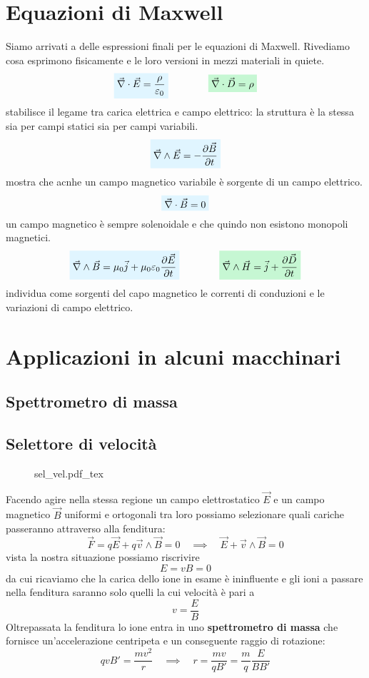 \documentclass[x11names]{report}
\newcommand{\incfig}[1]{%
	{#1.pdf_tex}
}
\newcommand{\viola}[1]{%
	\colorbox{myblue}{$\displaystyle #1$}
}
\newcommand{\rosso}[1]{%
	\colorbox{myred}{$\displaystyle #1$}}
\begin{document}
\section{Equazioni di Maxwell}
Siamo arrivati a delle espressioni finali per le equazioni di Maxwell. Rivediamo cosa esprimono fisicamente e le loro versioni in mezzi materiali in quiete.
\[
\viola{\vec{\nabla}\cdot \vec{E} = \frac{\rho}{\varepsilon_0}} \qquad \qquad \rosso{\vec{\nabla}\cdot \vec{D} = \rho}
\]
stabilisce il legame tra carica elettrica e campo elettrico: la struttura è la stessa sia per campi statici sia per campi variabili.
\[
\viola{\vec{\nabla}\wedge \vec{E} = -\frac{\partial \vec{B}}{\partial t}} 
\]
mostra che acnhe un campo magnetico variabile è sorgente di un campo elettrico.
\[
\viola{\vec{\nabla}\cdot \vec{B} = 0}
\]
un campo magnetico è sempre solenoidale e che quindo non esistono monopoli magnetici.
\[
\viola{\vec{\nabla}\wedge \vec{B} = \mu_0 \vec{j} + \mu_0\varepsilon_0\frac{\partial\vec{E}}{\partial t}} \qquad \qquad \rosso{\vec{\nabla} \wedge \vec{H} = \vec{j} + \frac{\partial \vec{D}}{\partial t}}
\]
individua come sorgenti del capo magnetico le correnti di conduzioni e le variazioni di campo elettrico.
\newpage
\section{Applicazioni in alcuni macchinari}
\subsection{Spettrometro di massa}
\subsection{Selettore di velocità}
\begin{wrapfigure}{r}{0.3\textwidth}
	\incfig{sel_vel}
\end{wrapfigure}
Facendo agire nella stessa regione un campo elettrostatico \(\vec{E}\) e un campo magnetico \(\vec{B}\) uniformi e ortogonali tra loro possiamo selezionare quali cariche passeranno attraverso alla fenditura:
\[
\vec{F} = q\vec{E} + q\vec{v}\wedge\vec{B} = 0 \quad \implies\quad \vec{E} + \vec{v} \wedge \vec{B} = 0
\]
vista la nostra situazione possiamo riscrivire
\[
E = vB = 0
\]
da cui ricaviamo che la carica dello ione in esame è ininfluente e gli ioni a passare nella fenditura saranno solo quelli la cui velocità è pari a
\[
v = \frac{E}{B}
\]
Oltrepassata la fenditura lo ione entra in uno \textbf{spettrometro di massa} che fornisce un'accelerazione centripeta e un conseguente raggio di rotazione:
\[
qvB' = \frac{mv^2}{r} \quad \implies \quad r = \frac{mv}{qB'} = \frac{m}{q}\frac{E}{BB'}
\]
\end{document}
